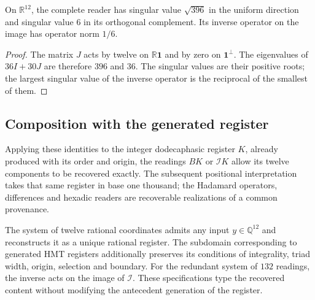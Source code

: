 \begin{corollary}
On $\mathbb R^{12}$, the complete reader has singular value
$\sqrt{396}$ in the uniform direction and singular value $6$ in its
orthogonal complement. Its inverse operator on the image has operator
norm $1/6$.
\end{corollary}
\begin{proof}
The matrix $J$ acts by twelve on $\mathbb R\mathbf1$ and by zero
on $\mathbf1^\perp$. The eigenvalues of $36I+30J$ are therefore
$396$ and $36$. The singular values are their positive
roots; the largest singular value of the inverse operator is the reciprocal
of the smallest of them.
\end{proof}

\subsection{Composition with the generated register}

Applying these identities to the integer dodecaphasic register $K$, already
produced with its order and origin, the readings $BK$ or $\mathcal I K$
allow its twelve components to be recovered exactly. The subsequent positional
interpretation takes that same register in base one thousand; the
Hadamard operators, differences and hexadic readers are
recoverable realizations of a common provenance.

The system of twelve rational coordinates admits any input
$y\in\mathbb Q^{12}$ and reconstructs it as a unique rational
register. The subdomain corresponding to generated HMT registers
additionally preserves its conditions of integrality, triad
width, origin, selection and boundary. For the redundant system of
$132$ readings, the inverse acts on the image of $\mathcal I$.
These specifications type the recovered content without modifying the
antecedent generation of the register.
